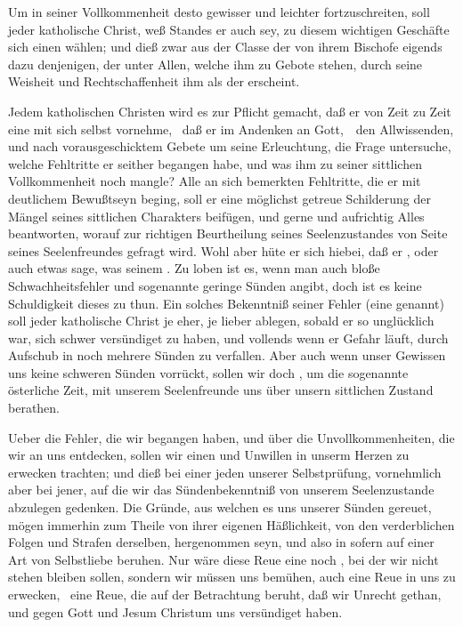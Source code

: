 \begin{aufza}
\item Um in seiner Vollkommenheit desto gewisser und leichter fortzuschreiten, soll jeder katholische Christ, weß Standes er auch sey, zu diesem wichtigen Geschäfte sich einen  wählen; und dieß zwar aus der Classe der von ihrem Bischofe eigends dazu  denjenigen, der unter Allen, welche ihm zu Gebote stehen, durch seine Weisheit und Rechtschaffenheit ihm als der  erscheint.
\item Jedem katholischen Christen wird es zur Pflicht gemacht, daß er von Zeit zu Zeit eine  mit sich selbst vornehme, \dh\  daß er im Andenken an Gott,~\ den Allwissenden, und nach vorausgeschicktem Gebete um seine Erleuchtung, die Frage untersuche, welche Fehltritte er seither begangen habe, und was ihm zu seiner sittlichen Vollkommenheit noch mangle? Alle an sich bemerkten Fehltritte, die er mit deutlichem Bewußtseyn beging, soll er  eine möglichst getreue Schilderung der Mängel seines sittlichen Charakters beifügen, und gerne und aufrichtig Alles beantworten, worauf zur richtigen Beurtheilung seines Seelenzustandes von Seite seines Seelenfreundes gefragt wird. Wohl aber hüte er sich hiebei, daß er , oder auch etwas sage, was seinem . Zu loben ist es, wenn man auch bloße Schwachheitsfehler und sogenannte geringe Sünden angibt, doch ist es keine Schuldigkeit dieses zu thun. Ein solches Bekenntniß seiner Fehler (eine  genannt) soll jeder katholische Christ je eher, je lieber ablegen, sobald er so unglücklich war, sich schwer versündiget zu haben, und vollends wenn er Gefahr läuft, durch Aufschub in noch mehrere Sünden zu verfallen. Aber auch wenn unser Gewissen uns keine schweren Sünden vorrückt, sollen wir doch , um die sogenannte österliche Zeit, mit unserem Seelenfreunde uns über unsern sittlichen Zustand berathen.
\item Ueber die Fehler, die wir begangen haben, und über die Unvollkommenheiten, die wir an uns entdecken, sollen wir einen  und Unwillen in unserm Herzen zu erwecken trachten; und dieß bei einer jeden unserer Selbstprüfung, vornehmlich aber bei jener, auf die wir das Sündenbekenntniß von unserem Seelenzustande abzulegen gedenken. Die Gründe, aus welchen es uns unserer Sünden gereuet, mögen immerhin zum Theile von ihrer eigenen Häßlichkeit, von den verderblichen Folgen und Strafen derselben, hergenommen seyn, und also in sofern auf einer Art von Selbstliebe beruhen. Nur wäre diese Reue eine noch , bei der wir nicht stehen bleiben sollen, sondern wir müssen uns bemühen, auch eine  Reue in uns zu erwecken, \dh\  eine Reue, die auf der Betrachtung beruht, daß wir Unrecht gethan, und gegen Gott und Jesum Christum uns versündiget haben.

\end{aufza}
